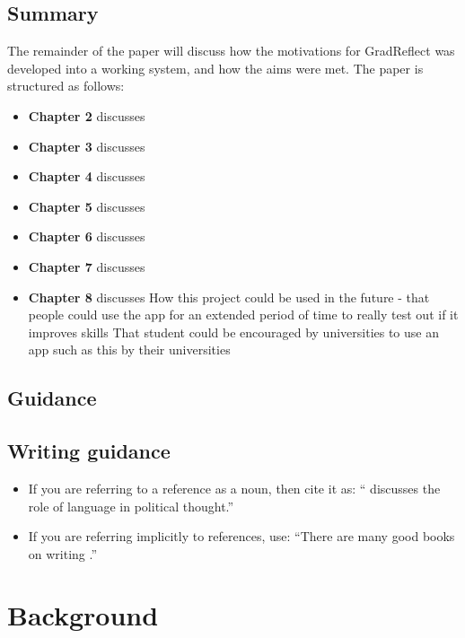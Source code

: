 \documentclass{l4proj}
\begin{document}
\section{Summary}
The remainder of the paper will discuss how the motivations for GradReflect was developed
into a working system, and how the aims were met.
The paper is structured as follows:
\begin{itemize}
    \item
    \textbf{Chapter 2} discusses
    \item
    \textbf{Chapter 3} discusses
    \item
    \textbf{Chapter 4} discusses
    \item
    \textbf{Chapter 5} discusses
    \item
    \textbf{Chapter 6} discusses
    \item
    \textbf{Chapter 7} discusses
    \item
    \textbf{Chapter 8} discusses
    How this project could be used in the future - that people could use the app for an extended period of 
time to really test out if it improves skills
That student could be encouraged by universities to use an app such as this by their universities
\end{itemize}



\section{Guidance}

\section{Writing guidance}
\begin{itemize}
\item If you are referring to a reference as a noun, then cite it as: ``\citet{Orw68} discusses the role of language in political thought.''
\item If you are referring implicitly to references, use: ``There are many good books on writing \citep{Orw68, Wil09, Pin15}.''
\end{itemize}


\chapter{Background}
\end{document}
